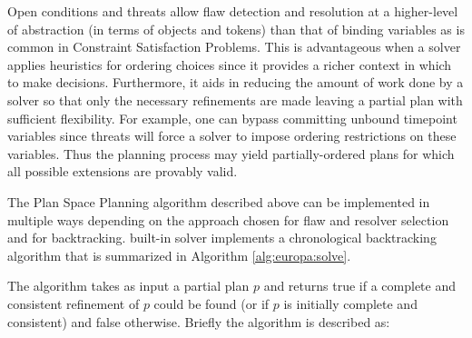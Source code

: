 Open conditions and threats allow flaw detection and resolution at a
higher-level of abstraction (\ie in terms of objects and tokens) than
that of binding variables as is common in Constraint Satisfaction
Problems. This is advantageous when a solver applies heuristics for
ordering choices since it provides a richer context in which to make
decisions.  Furthermore, it aids in reducing the amount of work done
by a solver so that only the necessary refinements are made leaving a
partial plan with sufficient flexibility. For example, one can bypass
committing unbound timepoint variables since threats will force a
solver to impose ordering restrictions on these variables.  Thus the
planning process may yield partially-ordered plans for which all
possible extensions are provably valid.

The Plan Space Planning algorithm described above can be implemented
in multiple ways depending on the approach chosen for flaw and
resolver selection and for backtracking. \eus built-in solver
implements a chronological backtracking algorithm that is summarized
in Algorithm \ref{alg:europa:solve}.


\begin{algorithm}[H]
\caption{$\mathrm{bool} ~ solve(plan)$}
\label{alg:europa:solve}
\end{algorithm}

The algorithm takes as input a partial plan $p$ and returns true if a
complete and consistent refinement of $p$ could be found (or if $p$ is
initially complete and consistent) and false otherwise. Briefly the
algorithm is described as:

